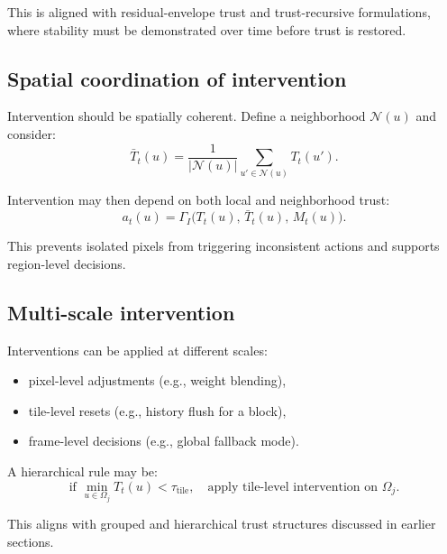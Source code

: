 \documentclass[11pt]{article}
\theoremstyle{definition}
\theoremstyle{plain}
\begin{document}
This is aligned with residual-envelope trust and trust-recursive formulations, where stability must be demonstrated over time before trust is restored.


\subsection{Spatial coordination of intervention}

Intervention should be spatially coherent. Define a neighborhood $\mathcal{N}(u)$ and consider:
\begin{equation}
\bar{T}_t(u)=\frac{1}{|\mathcal{N}(u)|}\sum_{u'\in\mathcal{N}(u)}T_t(u').
\end{equation}

Intervention may then depend on both local and neighborhood trust:
\begin{equation}
a_t(u)=\Gamma_I\!\bigl(T_t(u),\,\bar{T}_t(u),\,M_t(u)\bigr).
\end{equation}

This prevents isolated pixels from triggering inconsistent actions and supports region-level decisions.


\subsection{Multi-scale intervention}

Interventions can be applied at different scales:
\begin{itemize}[leftmargin=1.5em]
    \item pixel-level adjustments (e.g., weight blending),
    \item tile-level resets (e.g., history flush for a block),
    \item frame-level decisions (e.g., global fallback mode).
\end{itemize}

A hierarchical rule may be:
\begin{equation}
\text{if } \min_{u\in\Omega_j} T_t(u) < \tau_{\mathrm{tile}},
\quad \text{apply tile-level intervention on }\Omega_j.
\end{equation}

This aligns with grouped and hierarchical trust structures discussed in earlier sections.
\end{document}
